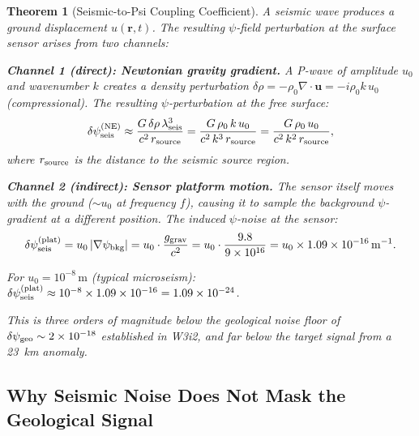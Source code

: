 \documentclass[aps,prd,twocolumn,superscriptaddress,nofootinbib]{revtex4-2}
\newtheorem{theorem}{Theorem}
\begin{document}
\begin{theorem}[Seismic-to-Psi Coupling Coefficient]
\label{thm:seismic-coupling}
A seismic wave produces a ground displacement $u(\mathbf{r},t)$.
The resulting $\psi$-field perturbation at the surface sensor
arises from two channels:

\textbf{Channel 1 (direct): Newtonian gravity gradient.}
A P-wave of amplitude $u_0$ and wavenumber $k$ creates a density
perturbation $\delta\rho = -\rho_0\nabla\cdot\mathbf{u}
= -i\rho_0 k\,u_0$ (compressional).  The resulting $\psi$-perturbation
at the free surface:
\begin{equation}
  \delta\psi_{\rm seis}^{\rm (NE)} \approx
  \frac{G\,\delta\rho\,\lambda_{\rm seis}^3}{c^2\,r_{\rm source}}
  = \frac{G\,\rho_0\,k\,u_0}{c^2\,k^3\,r_{\rm source}}
  = \frac{G\,\rho_0\,u_0}{c^2\,k^2\,r_{\rm source}},
  \label{eq:seis-ne}
\end{equation}
where $r_{\rm source}$ is the distance to the seismic source region.

\textbf{Channel 2 (indirect): Sensor platform motion.}
The sensor itself moves with the ground ($\sim u_0$ at frequency $f$),
causing it to sample the background $\psi$-gradient at a different
position.  The induced $\psi$-noise at the sensor:
\begin{equation}
  \delta\psi_{\rm seis}^{\rm (plat)} = u_0\,|\nabla\psi_{\rm bkg}|
  = u_0 \cdot \frac{g_{\rm grav}}{c^2}
  = u_0 \cdot \frac{9.8}{9\times10^{16}}
  = u_0 \times 1.09\times10^{-16}\,\mathrm{m}^{-1}.
  \label{eq:seis-platform}
\end{equation}

For $u_0 = 10^{-8}\,\mathrm{m}$ (typical microseism):
$\delta\psi_{\rm seis}^{\rm (plat)} \approx 10^{-8} \times 1.09\times10^{-16}
= 1.09\times10^{-24}$.

This is \emph{three orders of magnitude below the geological noise
floor} of $\delta\psi_{\rm geo} \sim 2\times10^{-18}$ established in
W3i2, and far below the target signal from a 23~km anomaly.
\end{theorem}

\subsection{Why Seismic Noise Does Not Mask the Geological Signal}
\end{document}
